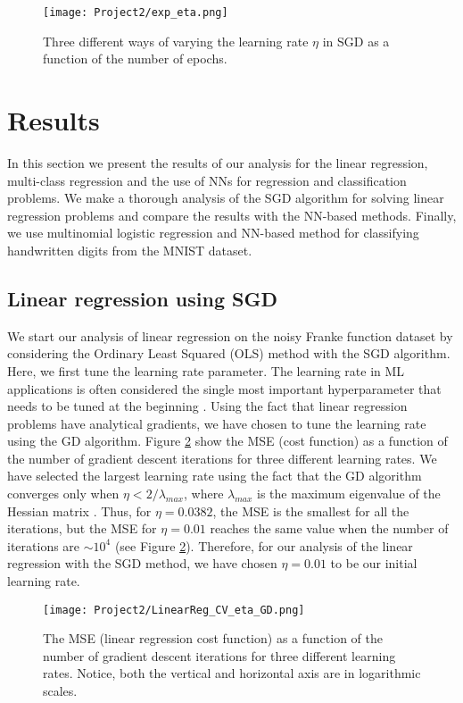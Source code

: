 \documentclass[a4paper]{article}
\begin{document}
\begin{figure}[H]
  \centering
  \texttt{[image: Project2/exp\_eta.png]}
  \caption{Three different ways of varying the learning rate $\eta$ in SGD as a function of the number of epochs.}
    \label{exp_eta}
\end{figure}

\section{Results}
In this section we present the results of our analysis for the linear regression, multi-class regression and the use of NNs for regression and classification problems. We make a thorough analysis of the SGD algorithm for solving linear regression problems and compare the results with the NN-based methods. Finally, we use multinomial logistic regression and NN-based method for classifying handwritten digits from the MNIST dataset.

\subsection{Linear regression using SGD}
We start our analysis of linear regression on the noisy Franke function dataset by considering the Ordinary Least Squared (OLS) method with the SGD algorithm. Here, we first tune the learning rate parameter. The learning rate in ML applications is often considered the single most important hyperparameter that needs to be tuned at the beginning \cite{Bengio2012}. Using the fact that linear regression problems have analytical gradients, we have chosen to tune the learning rate using the GD algorithm. Figure \ref{LinearReg_CV_eta_GD} show the MSE (cost function) as a function of the number of gradient descent iterations for three different learning rates. We have selected the largest learning rate using the fact that the GD algorithm converges only when $\eta<2/\lambda_{max}$, where $\lambda_{max}$ is the maximum eigenvalue of the Hessian matrix \cite{Pankaj}. Thus, for $\eta=0.0382$, the MSE is the smallest for all the iterations, but the MSE for $\eta=0.01$ reaches the same value when the number of iterations are $\sim 10^{4}$ (see Figure \ref{LinearReg_CV_eta_GD}). Therefore, for our analysis of the linear regression with the SGD method, we have chosen $\eta=0.01$ to be our initial learning rate.

\begin{figure}[H]
  \centering
  \texttt{[image: Project2/LinearReg\_CV\_eta\_GD.png]}
  \caption{The MSE (linear regression cost function) as a function of the number of gradient descent iterations for three different learning rates. Notice, both the vertical and horizontal axis are in logarithmic scales.}
    \label{LinearReg_CV_eta_GD}
\end{figure}
\end{document}
